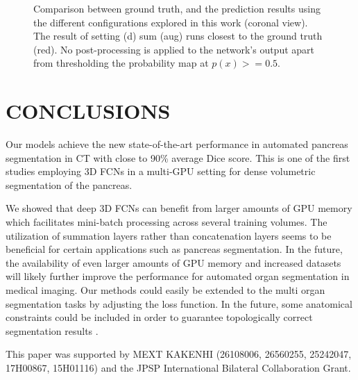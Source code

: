\documentclass[a4paper]{spie}  %
\begin{document}
\begin{figure}[tb]
	\centering
	\hfill
	\hfill
	\hfill
	\vspace{1em}

	\hfill
	\hfill
	\hfill

	\vspace{1em}
	\caption{Comparison between ground truth, and the prediction results using the different configurations explored in this work (coronal view). The result of setting (d) sum (aug) runs closest to the ground truth (red). No post-processing is applied to the network's output apart from thresholding the probability map at $p(x)>=0.5$.
	\label{fig:comparison}}
\end{figure}
\section{CONCLUSIONS}
Our models achieve the new state-of-the-art performance in automated pancreas segmentation in CT with close to 90\% average Dice score. This is one of the first studies employing 3D FCNs in a multi-GPU setting for dense volumetric segmentation of the pancreas.

We showed that deep 3D FCNs can benefit from larger amounts of GPU memory which facilitates mini-batch processing across several training volumes. The utilization of summation layers rather than concatenation layers seems to be beneficial for certain applications such as pancreas segmentation. In the future, the availability of even larger amounts of GPU memory and increased datasets will likely further improve the performance for automated organ segmentation in medical imaging. Our methods could easily be extended to the multi organ segmentation tasks by adjusting the loss function. In the future, some anatomical constraints could be included in order to guarantee topologically correct segmentation results \cite{oktay2017anatomically}.
\acknowledgments

This paper was supported by MEXT KAKENHI (26108006, 26560255, 25242047, 17H00867, 15H01116) and the JPSP International Bilateral Collaboration Grant.
\clearpage
\newpage


\end{document}
